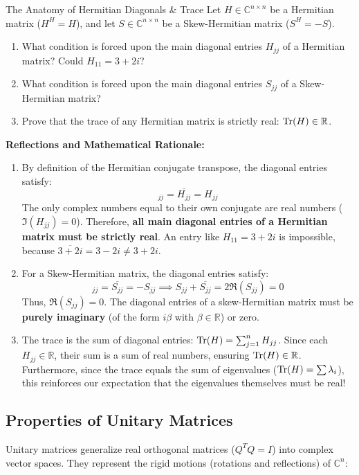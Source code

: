 \begin{ponderbox}{The Anatomy of Hermitian Diagonals \& Trace}
Let $H \in \mathbb{C}^{n \times n}$ be a Hermitian matrix ($H^H = H$), and let $S \in \mathbb{C}^{n \times n}$ be a Skew-Hermitian matrix ($S^H = -S$).
\begin{enumerate}
    \item What condition is forced upon the main diagonal entries $H_{jj}$ of a Hermitian matrix? Could $H_{11} = 3 + 2i$?
    \item What condition is forced upon the main diagonal entries $S_{jj}$ of a Skew-Hermitian matrix?
    \item Prove that the trace of any Hermitian matrix is strictly real: $\operatorname{Tr}(H) \in \mathbb{R}$.
\end{enumerate}
\tcblower
\textbf{Reflections and Mathematical Rationale:}
\begin{enumerate}
    \item By definition of the Hermitian conjugate transpose, the diagonal entries satisfy:
    \begin{equation*}
    [H^H]_{jj} = \overline{H_{jj}} = H_{jj}
    \end{equation*}
    The only complex numbers equal to their own conjugate are real numbers ($\Im(H_{jj}) = 0$). Therefore, \textbf{all main diagonal entries of a Hermitian matrix must be strictly real}. An entry like $H_{11} = 3 + 2i$ is impossible, because $\overline{3 + 2i} = 3 - 2i \ne 3 + 2i$.
    \item For a Skew-Hermitian matrix, the diagonal entries satisfy:
    \begin{equation*}
    [S^H]_{jj} = \overline{S_{jj}} = -S_{jj} \implies S_{jj} + \overline{S_{jj}} = 2\Re(S_{jj}) = 0
    \end{equation*}
    Thus, $\Re(S_{jj}) = 0$. The diagonal entries of a skew-Hermitian matrix must be \textbf{purely imaginary} (of the form $i\beta$ with $\beta \in \mathbb{R}$) or zero.
    \item The trace is the sum of diagonal entries: $\operatorname{Tr}(H) = \sum_{j=1}^n H_{jj}$. Since each $H_{jj} \in \mathbb{R}$, their sum is a sum of real numbers, ensuring $\operatorname{Tr}(H) \in \mathbb{R}$. Furthermore, since the trace equals the sum of eigenvalues ($\operatorname{Tr}(H) = \sum \lambda_i$), this reinforces our expectation that the eigenvalues themselves must be real!
\end{enumerate}
\end{ponderbox}

\subsection{Properties of Unitary Matrices}
Unitary matrices generalize real orthogonal matrices ($Q^T Q = I$) into complex vector spaces. They represent the rigid motions (rotations and reflections) of $\mathbb{C}^n$:

